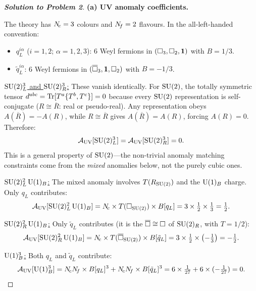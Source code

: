 \documentclass[11pt,a4paper]{article}
\begin{document}
\begin{proof}[\textbf{Solution to Problem 2}]

\textbf{(a) UV anomaly coefficients.}

The \UV{} theory has $N_{\!c} = 3$ colours and $N_{\!f} = 2$ flavours.  In the
all-left-handed convention:
\begin{itemize}
  \item $q_L^{i\alpha}$ ($i=1,2$; $\alpha=1,2,3$): 6 Weyl fermions in
    $(\square_3, \square_2, \mathbf{1})$ with $B = 1/3$.
  \item $\tilde{q}_L^{i\alpha}$: 6 Weyl fermions in
    $(\overline{\square}_3, \mathbf{1}, \square_2)$ with $B = -1/3$.
\end{itemize}

\underline{$\mathrm{SU}(2)_L^3$ and $\mathrm{SU}(2)_R^3$:}
These vanish identically.  For $\mathrm{SU}(2)$, the totally symmetric tensor
$d^{abc} = \mathrm{Tr}[T^a\{T^b,T^c\}] = 0$ because every $\mathrm{SU}(2)$
representation is self-conjugate ($R \cong \overline{R}$: real or
pseudo-real).  Any representation obeys $A(\overline{R}) = -A(R)$,
while $R \cong \overline{R}$ gives $A(\overline{R}) = A(R)$,
forcing $A(R) = 0$.  Therefore:
\begin{equation}
  \mathcal{A}_{\mathrm{UV}}[\mathrm{SU}(2)_L^3] = \mathcal{A}_{\mathrm{UV}}[\mathrm{SU}(2)_R^3] = 0.
\end{equation}
This is a general property of $\mathrm{SU}(2)$---the non-trivial anomaly
matching constraints come from the \emph{mixed} anomalies below,
not the purely cubic ones.

\underline{$\mathrm{SU}(2)_L^2\,\mathrm{U}(1)_B$:} The mixed anomaly involves
$T(R_{\mathrm{SU}(2)})$ and the $\mathrm{U}(1)_B$ charge.  Only $q_L$ contributes:
\begin{equation}
  \mathcal{A}_{\mathrm{UV}}[\mathrm{SU}(2)_L^2\,\mathrm{U}(1)_B]
  = N_{\!c} \times T(\square_{\mathrm{SU}(2)}) \times B[q_L]
  = 3 \times \tfrac{1}{2} \times \tfrac{1}{3}
  = \tfrac{1}{2}.
\end{equation}

\underline{$\mathrm{SU}(2)_R^2\,\mathrm{U}(1)_B$:} Only $\tilde{q}_L$ contributes (it is
the $\overline{\square} \cong \square$ of $\mathrm{SU}(2)_R$, with $T = 1/2$):
\begin{equation}
  \mathcal{A}_{\mathrm{UV}}[\mathrm{SU}(2)_R^2\,\mathrm{U}(1)_B]
  = N_{\!c} \times T(\overline{\square}_{\mathrm{SU}(2)}) \times B[\tilde{q}_L]
  = 3 \times \tfrac{1}{2} \times \bigl(-\tfrac{1}{3}\bigr)
  = -\tfrac{1}{2}.
\end{equation}

\underline{$\mathrm{U}(1)_B^3$:} Both $q_L$ and $\tilde{q}_L$ contribute:
\begin{equation}
  \mathcal{A}_{\mathrm{UV}}[\mathrm{U}(1)_B^3]
  = N_{\!c}N_{\!f} \times B[q_L]^3 + N_{\!c}N_{\!f} \times B[\tilde{q}_L]^3
  = 6 \times \tfrac{1}{27} + 6 \times (-\tfrac{1}{27})
  = 0.
\end{equation}


\end{proof}
\end{document}
